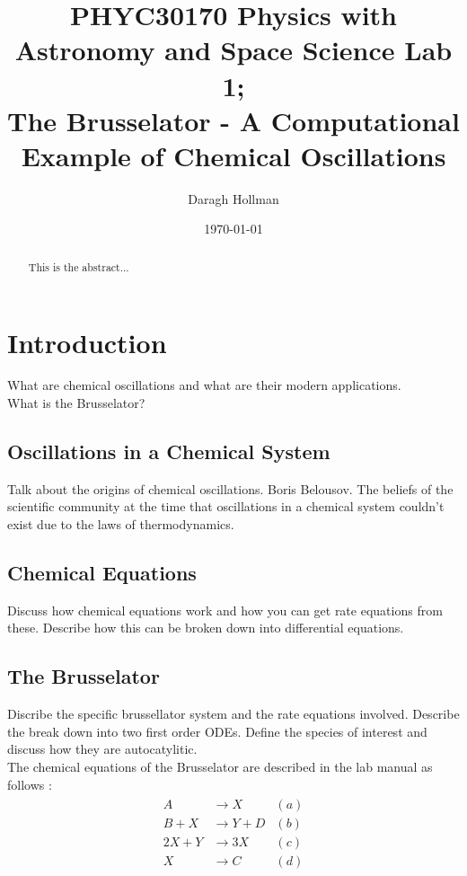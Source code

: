 \documentclass[reprint, amsmath, amssymb, aps]{revtex4-2}
\begin{document}
	
\title{PHYC30170 Physics with Astronomy and Space Science Lab 1;\\The Brusselator - A Computational Example of Chemical Oscillations}

\author{Daragh Hollman}
\date{\today}

\begin{abstract}
This is the abstract...
\end{abstract}

\maketitle

\section{Introduction}

What are chemical oscillations and what are their modern applications.\\

What is the Brusselator?

\subsection{Oscillations in a Chemical System}

Talk about the origins of chemical oscillations. Boris Belousov. The beliefs of the scientific community at the time that oscillations in a chemical system couldn't exist due to the laws of thermodynamics.

\subsection{Chemical Equations}

Discuss how chemical equations work and how you can get rate equations from these. Describe how this can be broken down into differential equations.

\subsection{The Brusselator}

Discribe the specific brussellator system and the rate equations involved. Describe the break down into two first order ODEs. Define the species of interest and discuss how they are autocatylitic.\\

The chemical equations of the Brusselator are described in the lab manual as follows \cite{manual}:
\begin{align}
	\begin{aligned}
	A &\rightarrow X & (a)\\
	B + X &\rightarrow Y + D & (b)\\
	2X + Y &\rightarrow 3X & (c)\\
	X &\rightarrow C & (d)
	\end{aligned}
\end{align}
\end{document}
